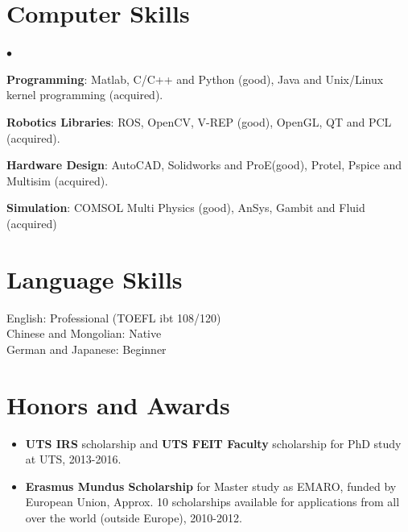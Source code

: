\documentclass[margin,line]{res}
\newenvironment{list2}{
  \begin{list}{$\bullet$}{%
      \setlength{\itemsep}{0in}
      \setlength{\parsep}{0in} \setlength{\parskip}{0in}
      \setlength{\topsep}{0in} \setlength{\partopsep}{0in} 
      \setlength{\leftmargin}{0.2in}}}{\end{list}}
\begin{document}
\begin{resume}
\begin{itemize}
\end{itemize}



\section{\sc Computer Skills} 
\begin{list2}
\item {\bf Programming}: Matlab, C/C++ and Python (good), Java and Unix/Linux kernel programming (acquired). \\

\item {\bf Robotics Libraries}: ROS, OpenCV, V-REP (good), OpenGL, QT and PCL (acquired).\\

\item {\bf Hardware Design}: AutoCAD, Solidworks and ProE(good), Protel, Pspice and Multisim (acquired).\\

\item {\bf Simulation}: COMSOL Multi Physics (good), AnSys, Gambit and Fluid (acquired) \\
\end{list2}




\section{\sc Language Skills} 
English: Professional (TOEFL ibt 108/120)\\
Chinese and Mongolian: Native\\
German and Japanese: Beginner

\section{\sc Honors and Awards} 
\begin{itemize}


\item {\bf UTS IRS} %
scholarship and {\bf UTS FEIT Faculty} scholarship for PhD study at UTS, 2013-2016.

%
\vspace*{-2.5mm}
\item {\bf Erasmus Mundus Scholarship} for Master study as EMARO, funded by European Union, Approx. 10 scholarships available for applications from all over the world (outside Europe), 2010-2012.


\end{itemize}
\end{resume}
\end{document}
